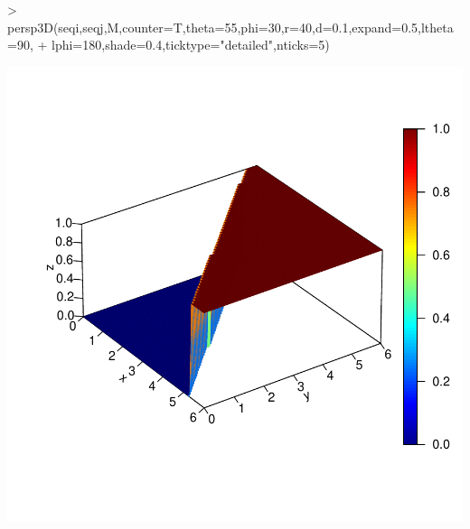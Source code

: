 \documentclass{article}
\begin{document}
\begin{Schunk}
\begin{Sinput}
>     persp3D(seqi,seqj,M,counter=T,theta=55,phi=30,r=40,d=0.1,expand=0.5,ltheta=90,
+             lphi=180,shade=0.4,ticktype="detailed",nticks=5)
\end{Sinput}
\end{Schunk}
\includegraphics{train_perceptron-004}
\end{document}
